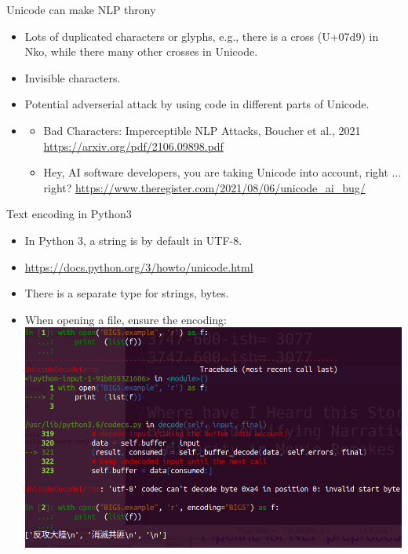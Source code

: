 \documentclass[11pt]{beamer}
\begin{document}
\begin{frame}{Unicode can make NLP throny}
  \begin{itemize}[<+->]
    \item Lots of duplicated characters or glyphs, e.g., there is a cross (U+07d9) in Nko, while there many other crosses in Unicode. 
    \item Invisible characters. 
    \item Potential adverserial attack by using code in different parts of Unicode.   
    \item   
    \begin{itemize}
      \item Bad‌‌‌‌‌‌‌‌‌‌‌‌‌‌‌‌‌‌‌‌‌‌‌‌‌‌‌‌‌‌‌‌‌‌‌‌‌‌‌‌‌‌‌‌‌‌‌‌‌‌‌‌‌‌‌‌‌‌‌‌‌‌‌‌‌‌‌‌‌‌‌‌‌‌‌‌‌‌‌‌‌‌‌‌‌‌‌‌‌‌‌‌‌‌‌ Characters: Imperceptible NLP Attacks, Boucher et al., 2021 \url{https://arxiv.org/pdf/2106.09898.pdf}
      \item Hey, AI software developers, you are taking Unicode into account, right ... right? \url{https://www.theregister.com/2021/08/06/unicode_ai_bug/}
    \end{itemize} 
  \end{itemize}
\end{frame}

\begin{frame}{Text encoding in Python3}
 \begin{itemize}[<+->]
  \item In Python 3, a string is by default in UTF-8. 
  \item \url{https://docs.python.org/3/howto/unicode.html}
  \item There is a separate type for strings, bytes.
  \item When opening a file, ensure the encoding:
  \includegraphics[width=\textwidth]{BIG5_encoding.png}
 \end{itemize}
\end{frame}
\end{document}
